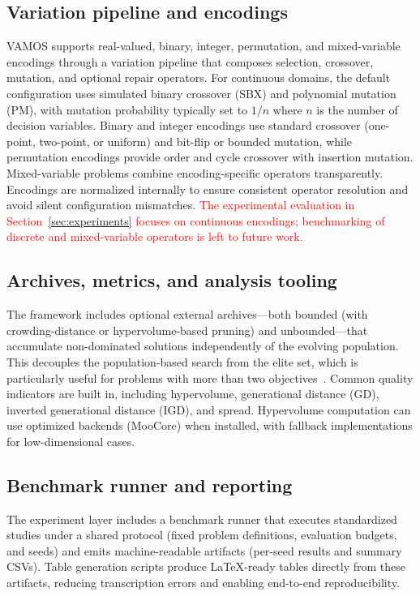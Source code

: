 \documentclass[journal]{IEEEtran}
\newcommand{\VAMOS}{VAMOS}
\begin{document}
\subsection{Variation pipeline and encodings}

\VAMOS{} supports real-valued, binary, integer, permutation, and mixed-variable encodings through a variation pipeline that composes selection, crossover, mutation, and optional repair operators. For continuous domains, the default configuration uses simulated binary crossover (SBX) and polynomial mutation (PM), with mutation probability typically set to $1/n$ where $n$ is the number of decision variables. Binary and integer encodings use standard crossover (one-point, two-point, or uniform) and bit-flip or bounded mutation, while permutation encodings provide order and cycle crossover with insertion mutation. Mixed-variable problems combine encoding-specific operators transparently. Encodings are normalized internally to ensure consistent operator resolution and avoid silent configuration mismatches. \textcolor{red}{The experimental evaluation in Section~\ref{sec:experiments} focuses on continuous encodings; benchmarking of discrete and mixed-variable operators is left to future work.}

\subsection{Archives, metrics, and analysis tooling}

The framework includes optional external archives---both bounded (with crowding-distance or hypervolume-based pruning) and unbounded---that accumulate non-dominated solutions independently of the evolving population. This decouples the population-based search from the elite set, which is particularly useful for problems with more than two objectives~\cite{IPS20}. Common quality indicators are built in, including hypervolume, generational distance (GD), inverted generational distance (IGD), and spread. Hypervolume computation can use optimized backends (MooCore) when installed, with fallback implementations for low-dimensional cases.

\subsection{Benchmark runner and reporting}

The experiment layer includes a benchmark runner that executes standardized studies under a shared protocol (fixed problem definitions, evaluation budgets, and seeds) and emits machine-readable artifacts (per-seed results and summary CSVs). Table generation scripts produce LaTeX-ready tables directly from these artifacts, reducing transcription errors and enabling end-to-end reproducibility.
\end{document}

